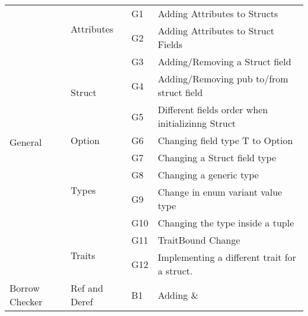 \begin{table}[]

\hskip-2.5cm\begin{tabular}{|l|l|l|l|}
\hline

\multirow{12}{*}{General}        
& \multirow{2}{*}{Attributes}    & G1  & Adding Attributes to Structs                                        \\
                                 &                                & G2  & Adding Attributes to Struct Fields                                  \\\cline{2-3}
                                 & \multirow{3}{*}{Struct}        & G3  & Adding/Removing a Struct field                                      \\
                                 &                                & G4  & Adding/Removing pub to/from struct field                            \\
                                 &                                & G5  & Different fields order when initializinng Struct                       \\\cline{2-3}
                                 & Option                         & G6  & Changing field type T to Option                                          \\\cline{2-3}
                                 & \multirow{4}{*}{Types}         & G7  & Changing a Struct field type                                        \\
                                 &                                & G8  & Changing a generic type                                             \\
                                 &                                & G9  & Change in enum variant value type                                   \\
                                 &                                & G10 & Changing the type inside a tuple                                         \\\cline{2-3}
                                 & \multirow{2}{*}{Traits}        & G11 & TraitBound Change                                                   \\
                                 &                                & G12 & Implementing a different trait for a struct.                            \\\cline{1-3}
\multirow{13}{*}{Borrow Checker} & \multirow{4}{*}{Ref and Deref} & B1  & Adding \&                                                           \\

\end{tabular}
\end{table}
